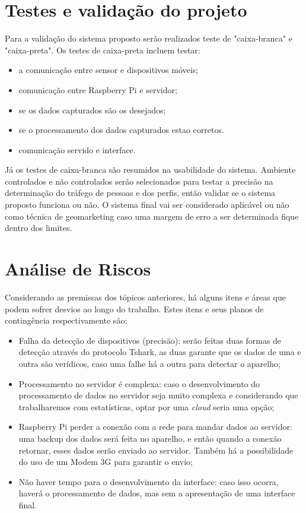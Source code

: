 \section{Testes e validação do projeto}
Para a validação do sistema proposto serão realizados teste de "caixa-branca" e "caixa-preta". Os testes de caixa-preta incluem testar:
\begin{itemize}
  \item a comunicação entre sensor e dispositivos móveis;
  \item comunicação entre Raspberry Pi e servidor;
  \item se os dados capturados são os desejados;
  \item se o processamento dos dados capturados estao corretos.
  \item comunicação servido e interface.
\end{itemize}

Já os testes de caixa-branca são resumidos na usabilidade do sistema. Ambiente controlados e não controlados serão selecionados
para testar a precisão na determinação do tráfego de pessoas e dos perfis, então validar se o sistema proposto funciona ou não.
O sistema final vai ser considerado aplicável ou não como técnica de geomarketing caso uma margem de erro a ser determinada fique dentro
dos limites.

\section{Análise de Riscos}
Considerando as premissas dos tópicos anteriores, há alguns itens e áreas que podem sofrer desvios ao longo do trabalho. Estes itens e seus planos
de contingência respectivamente são:

\begin{itemize}
  \item Falha da detecção de dispositivos (precisão): serão feitas duas formas de detecção através do protocolo Tshark, as duas garante que os dados
  de uma e outra são verídicos, caso uma falhe há a outra para detectar o aparelho;
  \item Processamento no servidor é complexa: caso o desenvolvimento do processamento de dados no servidor seja muito complexa e considerando
  que trabalharemos com estatísticas, optar por uma \emph{cloud} seria uma opção;
  \item Raspberry Pi perder a conexão com a rede para mandar dados ao servidor: uma backup dos dados será feita no aparelho, e então quando
  a conexão retornar, esses dados serão enviado ao servidor. Também há a possibilidade do uso de um Modem 3G para garantir o envio;
  \item Não haver tempo para o desenvolvimento da interface: caso isso ocorra, haverá o processamento de dados, mas sem a apresentação de uma interface final.
\end{itemize}
